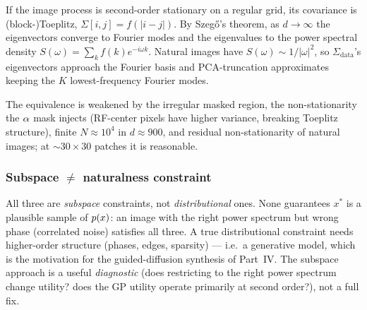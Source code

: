 \begin{proposition}
\label{prop:szego}
If the image process is second-order stationary on a regular grid, its covariance
is (block-)Toeplitz, $\Sigma[i,j]=f(|i-j|)$. By Szeg\H{o}'s theorem, as $d\to\infty$
the eigenvectors converge to Fourier modes and the eigenvalues to the power
spectral density $S(\omega)=\sum_k f(k)e^{-i\omega k}$. Natural images have
$S(\omega)\sim1/|\omega|^2$, so $\Sigma_{\mathrm{data}}$'s eigenvectors approach
the Fourier basis and PCA-truncation approximates keeping the $K$
lowest-frequency Fourier modes.
\end{proposition}
The equivalence is weakened by the irregular masked region, the non-stationarity
the $\alpha$ mask injects (RF-center pixels have higher variance, breaking Toeplitz
structure), finite $N\approx10^4$ in $d\approx900$, and residual
non-stationarity of natural images; at $\sim30\times30$ patches it is reasonable.

\subsubsection{Subspace $\ne$ naturalness constraint}
All three are \emph{subspace} constraints, not \emph{distributional} ones. None
guarantees $x^*$ is a plausible sample of $p(x)$: an image with the right power
spectrum but wrong phase (correlated noise) satisfies all three. A true
distributional constraint needs higher-order structure (phases, edges, sparsity)
--- i.e.\ a generative model, which is the motivation for the guided-diffusion
synthesis of Part~IV. The subspace approach is a useful \emph{diagnostic} (does
restricting to the right power spectrum change utility? does the GP utility
operate primarily at second order?), not a full fix.


